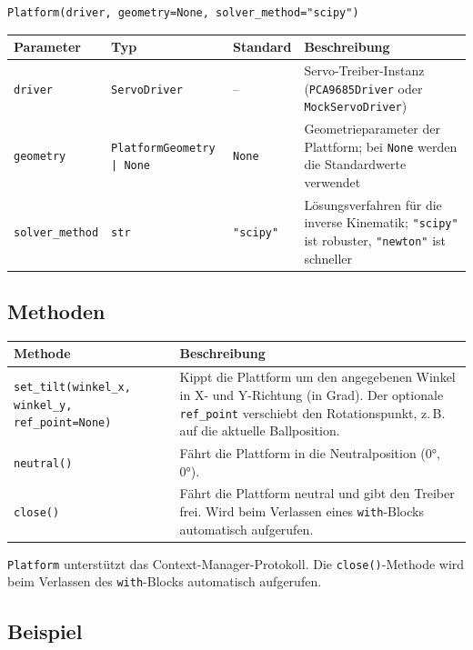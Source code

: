 \documentclass[11pt, a4paper]{scrreprt}
\begin{document}
\begin{lstlisting}
Platform(driver, geometry=None, solver_method="scipy")
\end{lstlisting}

\begin{tabularx}{\textwidth}{l l l X}
  \toprule
  Parameter & Typ & Standard & Beschreibung \\
  \midrule
  \texttt{driver} & \texttt{ServoDriver} & – & Servo-Treiber-Instanz (\texttt{PCA9685Driver} oder \texttt{MockServoDriver}) \\
  \texttt{geometry} & \texttt{PlatformGeometry | None} & \texttt{None} & Geometrieparameter der Plattform; bei \texttt{None} werden die Standardwerte verwendet \\
  \texttt{solver\_method} & \texttt{str} & \texttt{"scipy"} & Lösungsverfahren für die inverse Kinematik; \texttt{"scipy"} ist robuster, \texttt{"newton"} ist schneller \\
  \bottomrule
\end{tabularx}

\subsection*{Methoden}

\begin{tabularx}{\textwidth}{l X}
  \toprule
  Methode & Beschreibung \\
  \midrule
  \texttt{set\_tilt(winkel\_x, winkel\_y, ref\_point=None)} & Kippt die Plattform um den angegebenen Winkel in X- und Y-Richtung (in Grad). Der optionale \texttt{ref\_point} verschiebt den Rotationspunkt, z.\,B. auf die aktuelle Ballposition. \\
  \addlinespace
  \texttt{neutral()} & Fährt die Plattform in die Neutralposition (0°, 0°). \\
  \addlinespace
  \texttt{close()} & Fährt die Plattform neutral und gibt den Treiber frei. Wird beim Verlassen eines \texttt{with}-Blocks automatisch aufgerufen. \\
  \bottomrule
\end{tabularx}

\vspace{4mm}
\texttt{Platform} unterstützt das Context-Manager-Protokoll. Die \texttt{close()}-Methode
wird beim Verlassen des \texttt{with}-Blocks automatisch aufgerufen.

\subsection*{Beispiel}
\end{document}
